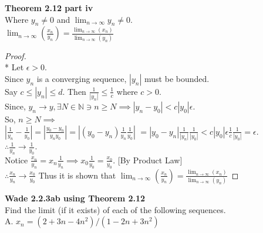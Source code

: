\documentclass[a4paper]{article}
\newcommand{\nat}{\mathbb{N}}
\begin{document}
\begin{flushleft}
        \textbf{Theorem 2.12 part iv} \\
        Where $y_n \neq 0$ and $\lim_{n \to \infty} y_n \neq 0$. \\
        $\lim_{n \to \infty} \left( \frac{x_n}{y_n} \right) = \frac{\lim_{n \to \infty}\left( x_n\right)}{\lim_{n \to \infty} \left( y_n\right)} $ \\
        \begin{proof}\mbox{}\\*
            Let $\epsilon > 0$. \\
            Since $y_n$ is a converging sequence, $|y_n|$ must be bounded. \\
            Say $c \leq |y_n| \leq d$. Then $\frac{1}{|y_n|} \leq \frac{1}{c}$ where $c > 0$. \\
            Since, $y_n \to y, \exists N \in \nat \ni n \geq N \implies |y_n - y_0| < c|y_0|\epsilon$. \\
            So, $n \geq N \implies$ \\
            $\left| \frac{1}{y_n} - \frac{1}{y_0}\right| = \left| \frac{y_0 - y_n}{y_n y_0} \right| = \left|(y_0 - y_n) \frac{1}{y_n} \frac{1}{y_0}\right|$
            $= |y_0 - y_n| \frac{1}{|y_n|}\frac{1}{|y_0|} < c|y_0|\epsilon \frac{1}{c} \frac{1}{|y_0|} = \epsilon$. \\
            $\therefore \frac{1}{y_n} \to \frac{1}{y_0}$. \\

            Notice $\frac{x_n}{y_n} = x_n \frac{1}{y_n} \implies x_0 \frac{1}{y_0} = \frac{x_0}{y_0}$.  [By Product Law]\\
            $\therefore \frac{x_n}{y_n} \to \frac{x_0}{y_0}$
            Thus it is shown that $\lim_{n \to \infty} \left( \frac{x_n}{y_n} \right) = \frac{\lim_{n \to \infty}\left( x_n\right)}{\lim_{n \to \infty} \left( y_n\right)}$
        \end{proof}


        \textbf{Wade 2.2.3ab using Theorem 2.12} \\
        Find the limit (if it exists) of each of the following sequences. \\

        A. $x_n = (2 + 3n-4n^2)/(1-2n + 3n^2)$


\end{flushleft}
\end{document}
